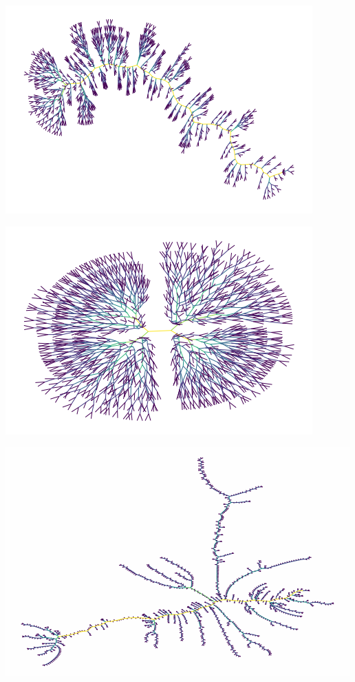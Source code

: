 \documentclass[12pt,twoside]{report}
\begin{document}
\begin{center}
\begin{minipage}{0.45\linewidth}
\includegraphics[width=\linewidth]{figures/er_bifurcations.png}
\end{minipage}%
\hfill
\begin{minipage}{0.45\linewidth}
\includegraphics[width=\linewidth]{figures/fractal_bifurcation.png}
\end{minipage}%
\hfill
\begin{minipage}{0.45\linewidth}
\includegraphics[width=\linewidth]{figures/uvl_bifurcations.png}

\end{minipage}
\end{center}
\end{document}
